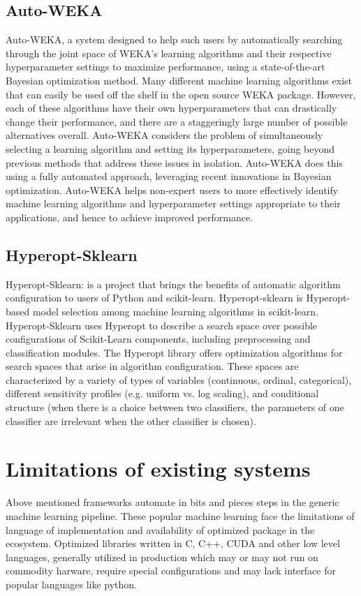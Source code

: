 \documentclass[10pt,onecolumn]{IEEEtran}
\begin{document}
\subsection{Auto-WEKA}
Auto-WEKA, a system designed to help such users by automatically searching through the joint space of WEKA’s learning algorithms and their respective hyperparameter settings to maximize performance, using a state-of-the-art Bayesian optimization method.  Many different machine learning algorithms exist that can easily be used off the shelf in the open source WEKA package. However, each of these algorithms have their own hyperparameters that can drastically change their performance, and there are a staggeringly large number of possible alternatives overall. Auto-WEKA considers the problem of simultaneously selecting a learning algorithm and setting its hyperparameters, going beyond previous methods that address these issues in isolation. Auto-WEKA does this using a fully automated approach, leveraging recent innovations in Bayesian optimization. Auto-WEKA helps non-expert users to more effectively identify machine learning algorithms and hyperparameter settings appropriate to their applications, and hence to achieve improved performance.
\subsection{Hyperopt-Sklearn}

Hyperopt-Sklearn: is a project that brings the benefits of automatic algorithm configuration to users of Python and scikit-learn. Hyperopt-sklearn is Hyperopt-based model selection among machine learning algorithms in scikit-learn. Hyperopt-Sklearn uses Hyperopt to describe a search space over possible configurations of Scikit-Learn components, including preprocessing and classification modules. The Hyperopt library offers optimization algorithms for search spaces that arise in algorithm configuration. These spaces are characterized by a variety of types of variables (continuous, ordinal, categorical), different sensitivity profiles (e.g. uniform vs. log scaling), and conditional structure (when there is a choice between two classifiers, the parameters of one classifier are irrelevant when the other classifier is chosen).


\section{Limitations of existing systems}
Above mentioned frameworks automate in bits and pieces steps in the generic machine learning pipeline. These popular machine learning face the limitations of language of implementation and availability of optimized package in the ecosystem. Optimized libraries written in C, C++, CUDA and other low level languages, generally utilized in production which may or may not run on commodity harware, require special configurations and may lack interface for popular languages like python. 
\end{document}
